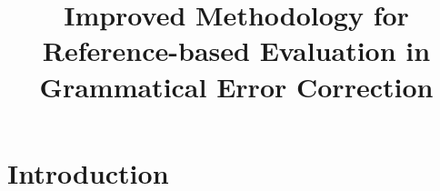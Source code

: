 \documentclass[letter,11pt]{article}
\begin{document}
	
	\title{Improved Methodology for Reference-based Evaluation in \\
		Grammatical Error Correction}
	
	
	
	\maketitle
	
	\begin{abstract}
		
	\end{abstract}
	
	\section{Introduction}
	
	
	
	
\end{document}
